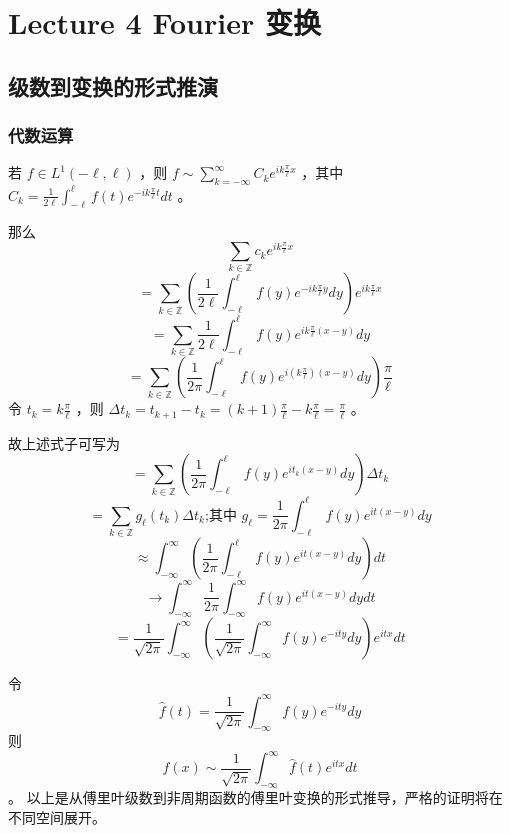 \documentclass[linespread=1.5,openany]{book}%
\theoremstyle{plain}
\begin{document}
		\part{Lecture 4 Fourier 变换}{
			\chapter{级数到变换的形式推演}
			{\section{代数运算}
				若 \(f \in L^{1}(-\ell,\ell)\) ，则 \(f \sim \sum_{k = -\infty}^{\infty} C_{k}e^{i k \frac{\pi}{\ell} x}\) ，其中 \(C_{k} = \frac{1}{2\ell}\int_{-\ell}^{\ell} f(t)e^{-i k \frac{\pi}{\ell} t} dt\) 。
				
				那么 \[\sum_{k \in \mathbb{Z}} c_{k}e^{i k \frac{\pi}{\ell} x}\]
				\[
				= \sum_{k \in \mathbb{Z}} \left(\frac{1}{2\ell}\int_{-\ell}^{\ell} f(y)e^{-i k \frac{\pi}{\ell} y} dy\right) e^{i k \frac{\pi}{\ell} x}
				\]
				\[
				= \sum_{k \in \mathbb{Z}} \frac{1}{2\ell} \int_{-\ell}^{\ell} f(y) e^{i k \frac{\pi}{\ell}(x - y)} dy
				\]
				\[
				= \sum_{k \in \mathbb{Z}} \left(\frac{1}{2\pi}\int_{-\ell}^{\ell} f(y) e^{i (k \frac{\pi}{\ell})(x - y)} dy\right) \frac{\pi}{\ell}
				\]
				令 \(t_{k} = k \frac{\pi}{\ell}\) ，则 \(\Delta t_{k} = t_{k + 1} - t_{k} = (k + 1)\frac{\pi}{\ell} - k\frac{\pi}{\ell} = \frac{\pi}{\ell}\) 。
				
				故上述式子可写为
				\[
				= \sum_{k \in \mathbb{Z}} \left(\frac{1}{2\pi}\int_{-\ell}^{\ell} f(y)e^{i t_{k}(x - y)} dy\right) \Delta t_{k}
				\]
				\[
				= \sum_{k \in \mathbb{Z}} g_{\ell}(t_{k})\Delta t_{k} \text{;其中 } g_{\ell} = \frac{1}{2\pi}\int_{-\ell}^{\ell} f(y)e^{i t(x - y)} dy
				\]
				\[
				\approx \int_{-\infty}^{\infty} \left(\frac{1}{2\pi}\int_{-\ell}^{\ell} f(y)e^{i t(x - y)} dy\right) dt
				\]
				\[
				\to \int_{-\infty}^{\infty} \frac{1}{2\pi}\int_{-\infty}^{\infty} f(y)e^{i t(x - y)} dy dt
				\]
				\[
				= \frac{1}{\sqrt{2\pi}}\int_{-\infty}^{\infty} \left(\frac{1}{\sqrt{2\pi}}\int_{-\infty}^{\infty} f(y)e^{-i t y} dy\right) e^{i t x} dt
				\]
				
				令 \[\hat{f}(t) = \frac{1}{\sqrt{2\pi}}\int_{-\infty}^{\infty} f(y)e^{-i t y} dy\] 
				则 \[f(x) \sim \frac{1}{\sqrt{2\pi}}\int_{-\infty}^{\infty} \hat{f}(t) e^{i t x} dt \] 。
				以上是从傅里叶级数到非周期函数的傅里叶变换的形式推导，严格的证明将在不同空间展开。 
}}
\end{document}
